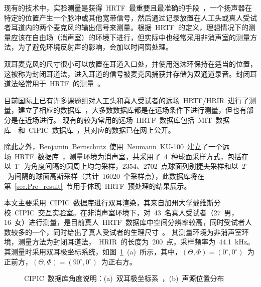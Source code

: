 现有的技术中，实验测量是获得~HRTF~最重要且最准确的手段~，一个扬声器在特定的位置产生一个脉冲或其他宽带信号，然后通过记录放置在人工头或真人受试者耳道内的两个麦克风的输出信号来测量。根据~HRTF~的定义，理想情况下的测量应该在自由场（消声室）的环境下进行，但实际中也经常采用非消声室的测量方法，为了避免环境反射声的影响，会加以时间窗处理。

双耳麦克风的尺寸很小可以放置在耳道入口处，并使用泡沫环保持在适当的位置，这被称为封闭耳道法，进入耳道的信号被麦克风捕获并存储为双通道录音。封闭耳道法经常用于~HRTF~的测量~。

目前国际上已有许多课题组对人工头和真人受试者的远场~HRTF/HRIR~进行了测量，建立了相应的数据库~，大多数数据库都是在远场条件下进行测量，但也有部分是在近场进行。
现有的较为常用的远场~HRTF~数据库包括~MIT~数据库~~和~CIPIC~数据库~，其对应的数据已在网上公开。

除此之外，Benjamin~Bernschutz~使用~Neumann~KU-100~建立了一个远场~HRTF~数据库~，测量环境为消声室，共采用了~4~种球面采样方式，包括在以~$1^{\circ}$~为角度间隔的圆周上均匀采样，2354、2702~点球面列别捷夫采样和以~$2^{\circ}$~为间隔的球面高斯采样（共计~16020~个采样点），此数据库将在第~\ref{sec.Pre_result}~节用于体现~HRTF~预处理的结果展示。


本文主要采用~CIPIC~数据库进行双耳渲染，其来自加州大学戴维斯分校~CIPIC~交互实验室。在非消声室环境下，对~43~名真人受试者（27~男，16~女）进行测量，是目前真人~HRTF~数据库中空间分辨率较高，同时受试者人数较多的一个，同时给出了真人受试者的生理尺寸~。
其测量环境为非消声室环境，测量方法为封闭耳道法，~HRIR~的长度为~200~点，采样频率为~44.1~kHz。其测量时采用双耳极坐标系统，如图~\ref{fig:CIPIC_location}~(a)~所示，其中，$(\varTheta,\varPhi) = (0^{\circ},0^{\circ})$~为正前方，$(\varTheta,\varPhi) = (90^{\circ},0^{\circ})$~为正右方。

\begin{figure}[H]
\centering
{}
\hfill
{}
\caption{CIPIC~数据库角度说明：(a)~双耳极坐标系~，(b)~声源位置分布}
\label{fig:CIPIC_location}
\end{figure}

